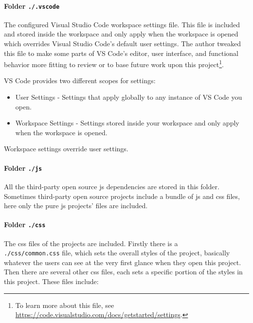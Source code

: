 \paragraph{Folder \texttt{./.vscode}}

The configured Visual Studio Code workspace settings file. This file is included and stored inside the workspace and only apply when the workspace is opened which overrides Visual Studio Code's default user settings. The author tweaked this file to make some parts of VS Code's editor, user interface, and functional behavior more fitting to review or to base future work upon this project\footnote{ To learn more about this file, see \url{https://code.visualstudio.com/docs/getstarted/settings}.}. 

VS Code provides two different scopes for settings:

\begin{itemize}
  \item User Settings - Settings that apply globally to any instance of VS Code you open.
  \item Workspace Settings - Settings stored inside your workspace and only apply when the workspace is opened.
\end{itemize}

Workspace settings override user settings\cite{bib:ms:vscode}.

\paragraph{Folder \texttt{./js}}

All the third-party open source \gls{js} dependencies are stored in this folder. Sometimes third-party open source projects include a bundle of \acrfull{js} and \gls{css} files, here only the pure \gls{js} projects' files are included.

\paragraph{Folder \texttt{./css}}

The \gls{css} files of the projects are included. Firstly there is a \\\texttt{./css/common.css} file, which sets the overall styles of the project, basically whatever the users can see at the very first glance when they open this project. Then there are several other \gls{css} files, each sets a specific portion of the styles in this project. These files include:

